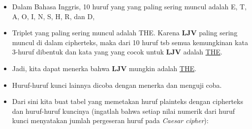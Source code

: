 \documentclass{article}
\begin{document}

\begin{itemize}
    \item Dalam Bahasa Inggris, 10 huruf yang yang paling sering muncul adalah E, T, A, O, I, N, S, H, R, dan D,
    \item Triplet yang paling sering muncul adalah THE. Karena \textbf{LJV} paling sering muncul di dalam cipherteks, maka dari 10 huruf tsb semua kemungkinan kata 3-huruf dibentuk dan kata yang yang cocok untuk \textbf{LJV} adalah \underline{THE}.
    \item Jadi, kita dapat menerka bahwa \textbf{LJV} mungkin adalah \underline{THE}.
    \item Huruf-huruf kunci lainnya dicoba dengan menerka dan menguji coba.
    \item Dari sini kita buat tabel yang memetakan huruf plainteks dengan cipherteks dan huruf-huruf kuncinya (ingatlah bahwa setiap nilai numerik dari huruf kunci menyatakan jumlah pergeseran huruf pada \textit{Caesar cipher}):
\end{itemize}
\end{document}
